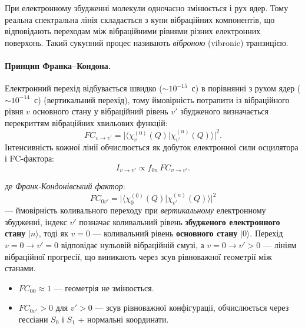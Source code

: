 При електронному збудженні молекули одночасно змінюється і рух ядер.
Тому реальна спектральна лінія складається з купи вібраційних компонентів,
що відповідають переходам між вібраційними рівнями різних електронних поверхонь.
Такий сукупний процес називають \emph{віброною} (vibronic) транзицією.

\paragraph{Принцип Франка–Кондона.}
Електронний перехід відбувається швидко  ($\sim 10^{-15}$~с) в порівнянні з рухом ядер ($\sim 10^{-14}$~с) (вертикальний перехід),
тому ймовірність потрапити із вібраційного рівня $v$ основного стану у вібраційний рівень $v'$
збудженого визначається перекриттям вібраційних хвильових функцій:
\[
    FC_{v\to v'} = \bigl|\langle \chi_v^{(0)}(Q) | \chi_{v'}^{(n)}(Q) \rangle\bigr|^2.
\]
Інтенсивність кожної лінії обчислюється як добуток електронної сили осцилятора і FC-фактора:
\[
    I_{v\to v'} \propto f_{0n}\, FC_{v\to v'}.
\]

де \emph{Франк-Кондонівський фактор}:
\[
    \boxed{FC_{0 v'} = \bigl| \langle \chi_0^{(0)}(Q) | \chi_{v'}^{(n)}(Q) \rangle \bigr|^2}
\]
--- ймовірність коливального переходу при \emph{вертикальному} електронному збудженні, індекс $v'$ позначає коливальний рівень \textbf{збудженого електронного стану} $|n\rangle$, тоді як $v=0$ --- коливальний рівень \textbf{основного стану} $|0\rangle$. Перехід $v=0 \to v'=0$ відповідає нульовій вібраційній смузі, а $v=0 \to v'>0$ --- лініям вібраційної прогресії, що виникають через зсув рівноважної геометрії між станами.

\begin{itemize}
    \item $FC_{00} \approx 1$ --- геометрія не змінюється.
    \item $FC_{0v'} > 0$ для $v' > 0$ --- зсув рівноважної конфігурації, обчислюється через гессіани $S_0$ і $S_1$ + нормальні координати.
\end{itemize}


